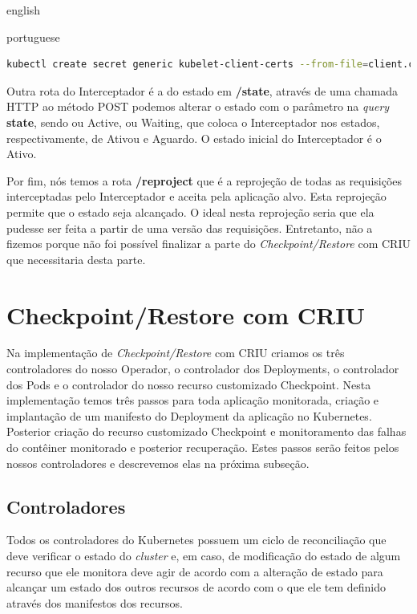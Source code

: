 \begin{otherlanguage*}{english}
\begin{otherlanguage*}{portuguese}
\begin{lstlisting}[language=bash,caption={Criação do Secret para comunicação com o kubelet para compartilhamento com nosso Interceptador.},label={listing:kubelet-secret}]
kubectl create secret generic kubelet-client-certs --from-file=client.crt=/etc/kubernetes/pki/apiserver-kubelet-client.crt --from-file=client.key=/etc/kubernetes/pki/apiserver-kubelet-client.key
\end{lstlisting}

Outra rota do Interceptador é a do estado em \textbf{/state}, através de uma chamada
HTTP ao método POST podemos alterar o estado com o parâmetro na \textit{query}
\textbf{state}, sendo ou Active, ou Waiting, que coloca o Interceptador nos estados,
respectivamente, de Ativou e Aguardo. O estado inicial do Interceptador é o Ativo.

Por fim, nós temos a rota \textbf{/reproject} que é a reprojeção de todas as requisições
interceptadas pelo Interceptador e aceita pela aplicação alvo. Esta reprojeção permite
que o estado seja alcançado. O ideal nesta reprojeção seria que ela pudesse ser feita a
partir de uma versão das requisições. Entretanto, não a fizemos porque não foi possível
finalizar a parte do \textit{Checkpoint/Restore} com CRIU que necessitaria desta parte.

\section{Checkpoint/Restore com CRIU}

Na implementação de \textit{Checkpoint/Restore} com CRIU criamos os três controladores do
nosso Operador, o controlador dos Deployments, o controlador dos Pods e o controlador do
nosso recurso customizado Checkpoint. Nesta implementação temos três passos para toda
aplicação monitorada, criação e implantação de um manifesto do Deployment da aplicação
no Kubernetes. Posterior criação do recurso customizado Checkpoint e monitoramento das
falhas do contêiner monitorado e posterior recuperação. Estes passos serão feitos pelos 
nossos controladores e descrevemos elas na próxima subseção.

\subsection{Controladores}

Todos os controladores do Kubernetes possuem um ciclo de reconciliação que deve
verificar o estado do \textit{cluster} e, em caso, de modificação do estado de algum
recurso que ele monitora deve agir de acordo com a alteração de estado para alcançar
um estado dos outros recursos de acordo com o que ele tem definido através dos manifestos
dos recursos.


\end{otherlanguage*}
\end{otherlanguage*}
